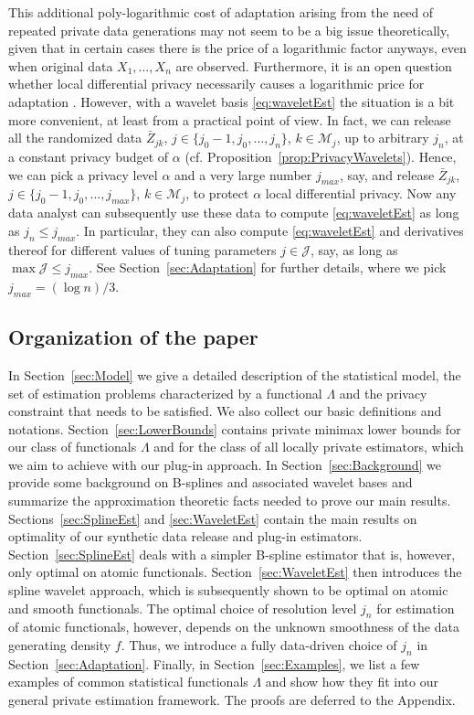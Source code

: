 \documentclass[preprint]{imsart}
\numberwithin{equation}{section}
\begin{document}
This additional poly-logarithmic cost of adaptation arising from the need of repeated private data generations may not seem to be a big issue theoretically, given that in certain cases there is the price of a logarithmic factor anyways, even when original data $X_1,\dots, X_n$ are observed. Furthermore, it is an open question whether local differential privacy necessarily causes a logarithmic price for adaptation \citep[cf.][Section~6]{ButuceaPrivacy}. However, with a wavelet basis \eqref{eq:waveletEst} the situation is a bit more convenient, at least from a practical point of view. In fact, we can release all the randomized data $\bar{Z}_{jk}$, $j\in\{j_0-1, j_0,\dots, j_n\}$, $k\in\mathcal M_j$, up to arbitrary $j_n$, at a constant privacy budget of $\alpha$ (cf. Proposition~\ref{prop:PrivacyWavelets}). Hence, we can pick a privacy level $\alpha$ and a very large number $j_{max}$, say, and release $\bar{Z}_{jk}$, $j\in\{j_0-1, j_0, \dots, j_{max}\}$, $k\in\mathcal M_j$, to protect $\alpha$ local differential privacy. Now any data analyst can subsequently use these data to compute \eqref{eq:waveletEst} as long as $j_n\le j_{max}$. In particular, they can also compute \eqref{eq:waveletEst} and derivatives thereof for different values of tuning parameters $j\in\mathcal J$, say, as long as $\max \mathcal J\le j_{max}$. See Section~\ref{sec:Adaptation} for further details, where we pick $j_{max}=(\log n)/3$.


\subsection{Organization of the paper}


In Section~\ref{sec:Model} we give a detailed description of the statistical model, the set of estimation problems characterized by a functional $\Lambda$ and the privacy constraint that needs to be satisfied. We also collect our basic definitions and notations. Section~\ref{sec:LowerBounds} contains private minimax lower bounds for our class of functionals $\Lambda$ and for the class of all locally private estimators, which we aim to achieve with our plug-in approach. In Section~\ref{sec:Background} we provide some background on B-splines and associated wavelet bases and summarize the approximation theoretic facts needed to prove our main results. Sections~\ref{sec:SplineEst} and \ref{sec:WaveletEst} contain the main results on optimality of our synthetic data release and plug-in estimators. Section~\ref{sec:SplineEst} deals with a simpler B-spline estimator that is, however, only optimal on atomic functionals. Section~\ref{sec:WaveletEst} then introduces the spline wavelet approach, which is subsequently shown to be optimal on atomic and smooth functionals. The optimal choice of resolution level $j_n$ for estimation of atomic functionals, however, depends on the unknown smoothness of the data generating density $f$. Thus, we introduce a fully data-driven choice of $j_n$ in Section~\ref{sec:Adaptation}. Finally, in Section~\ref{sec:Examples}, we list a few examples of common statistical functionals $\Lambda$ and show how they fit into our general private estimation framework. The proofs are deferred to the Appendix.
\end{document}
